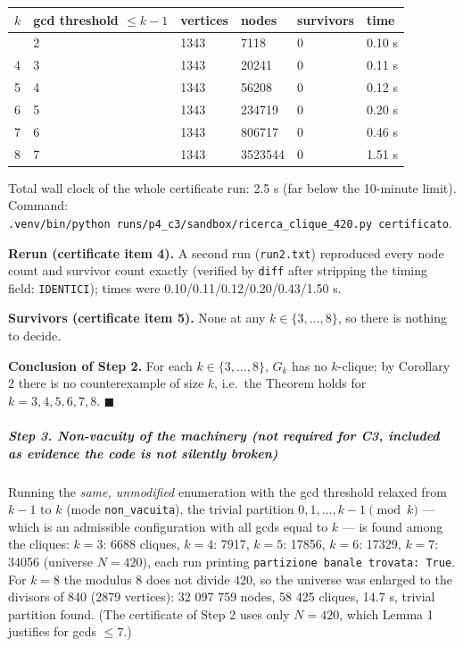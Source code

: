 {\def\LTcaptype{none} %
\begin{longtable}[]{@{}llllll@{}}
\toprule\noalign{}
\(k\) & gcd threshold \(\le k-1\) & vertices & nodes & survivors &
time \\
\midrule\noalign{}
\endhead
\bottomrule\noalign{}
\endlastfoot
3 & 2 & 1343 & 7118 & 0 & 0.10 s \\
4 & 3 & 1343 & 20241 & 0 & 0.11 s \\
5 & 4 & 1343 & 56208 & 0 & 0.12 s \\
6 & 5 & 1343 & 234719 & 0 & 0.20 s \\
7 & 6 & 1343 & 806717 & 0 & 0.46 s \\
8 & 7 & 1343 & 3523544 & 0 & 1.51 s \\
\end{longtable}
}

Total wall clock of the whole certificate run: 2.5 s (far below the
10-minute limit). Command:
\texttt{.venv/bin/python\ runs/p4\_c3/sandbox/ricerca\_clique\_420.py\ certificato}.

\textbf{Rerun (certificate item 4).} A second run (\texttt{run2.txt})
reproduced every node count and survivor count exactly (verified by
\texttt{diff} after stripping the timing field: \texttt{IDENTICI});
times were 0.10/0.11/0.12/0.20/0.43/1.50 s.

\textbf{Survivors (certificate item 5).} None at any
\(k\in\{3,\dots,8\}\), so there is nothing to decide.

\textbf{Conclusion of Step 2.} For each \(k\in\{3,\dots,8\}\), \(G_k\)
has no \(k\)-clique; by Corollary 2 there is no counterexample of size
\(k\), i.e.~the Theorem holds for \(k=3,4,5,6,7,8\). \(\blacksquare\)

\subparagraph{Step 3. Non-vacuity of the machinery (not required for C3,
included as evidence the code is not silently
broken)}\label{step-3.-non-vacuity-of-the-machinery-not-required-for-c3-included-as-evidence-the-code-is-not-silently-broken}

Running the \emph{same, unmodified} enumeration with the gcd threshold
relaxed from \(k-1\) to \(k\) (mode \texttt{non\_vacuita}), the trivial
partition \(0,1,\dots,k-1 \pmod k\) --- which is an admissible
configuration with all gcds equal to \(k\) --- is found among the
cliques: \(k=3\): 6688 cliques, \(k=4\): 7917, \(k=5\): 17856, \(k=6\):
17329, \(k=7\): 34056 (universe \(N=420\)), each run printing
\texttt{partizione\ banale\ trovata:\ True}. For \(k=8\) the modulus 8
does not divide 420, so the universe was enlarged to the divisors of 840
(2879 vertices): 32 097 759 nodes, 58 425 cliques, 14.7 s, trivial
partition found. (The certificate of Step 2 uses only \(N=420\), which
Lemma 1 justifies for gcds \(\le7\).)

